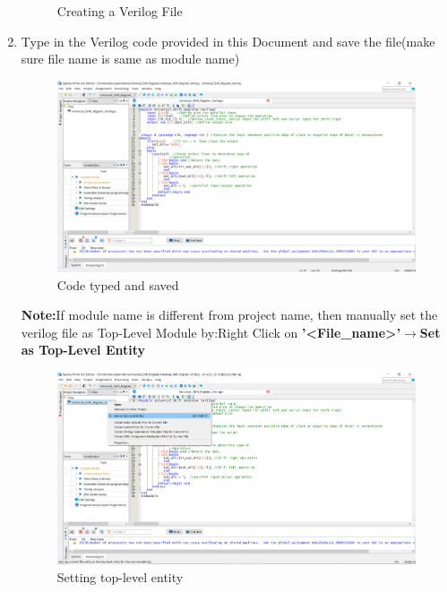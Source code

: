 \documentclass[12pt]{article}
\begin{document}
\begin{enumerate}
\begin{figure}[H]
        \caption{Creating a Verilog File}
    \end{figure}
    \item Type in the Verilog code provided in this Document and save the file(make sure file name is same as module name)
    \begin{figure}[H]
        \centering
        \includegraphics[scale=0.4]{USR2.png}
        \caption{Code typed and saved}
    \end{figure}
    
    \textbf{Note:}If module name is different from project name, then manually set the verilog file as Top-Level Module by:Right Click on \textbf{'<File\_name>'$\rightarrow$Set as Top-Level Entity}
    \begin{figure}[H]
        \centering
        \includegraphics[scale=0.4]{USR3.png}
        \caption{Setting top-level entity}
    \end{figure}
    

\end{enumerate}
\end{document}
